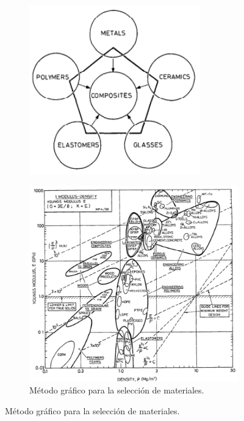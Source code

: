 \documentclass[12pt,a4paper]{article}
\begin{document}
\begin{figure}[t]
    \centering
    \begin{subfigure}{0.45\textwidth}
        \includegraphics[width=\textwidth]{Figuras/image.png}
        \label{fig:familias}
    \end{subfigure}
    \begin{subfigure}{0.45\textwidth}
        \includegraphics[width=\textwidth]{Figuras/grafico.png}
        \caption{Método gráfico para la selección de materiales.}
        \label{fig:grafico}
    \end{subfigure}    
\end{figure}
\end{document}
